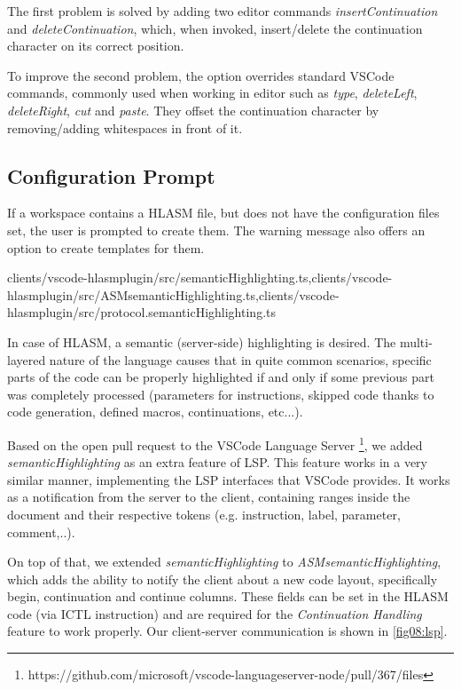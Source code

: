 The first problem is solved by adding two editor commands \emph{insertContinuation} and \emph{deleteContinuation}, which, when invoked, insert/delete the continuation character on its correct position.

To improve the second problem, the option overrides standard VSCode commands, commonly used when working in editor such as \emph{type}, \emph{deleteLeft}, \emph{deleteRight}, \emph{cut} and \emph{paste}. They offset the continuation character by removing/adding whitespaces in front of it.


\subsection{Configuration Prompt}

If a workspace contains a HLASM file, but does not have the configuration files set, the user is prompted to create them. The warning message also offers an option to create templates for them.

{clients/vscode-hlasmplugin/src/semanticHighlighting.ts,clients/vscode-hlasmplugin/src/ASMsemanticHighlighting.ts,clients/vscode-hlasmplugin/src/protocol.semanticHighlighting.ts}

In case of HLASM, a semantic (server-side) highlighting is desired. The multi-layered nature of the language causes that in quite common scenarios, specific parts of the code can be properly highlighted if and only if some previous part was completely processed (parameters for instructions, skipped code thanks to code generation, defined macros, continuations, etc...).

Based on the open pull request to the VSCode Language Server \footnote{https://github.com/microsoft/vscode-languageserver-node/pull/367/files}, we added \emph{semanticHighlighting} as an extra feature of LSP. This feature works in a very similar manner, implementing the LSP interfaces that VSCode provides. It works as a notification from the server to the client, containing ranges inside the document and their respective tokens (e.g. instruction, label, parameter, comment,..). 

On top of that, we extended \emph{semanticHighlighting} to \emph{ASMsemanticHighlighting}, which adds the ability to notify the client about a new code layout, specifically begin, continuation and continue columns. These fields can be set in the HLASM code (via ICTL instruction) and are required for the \emph{Continuation Handling} feature to work properly. Our client-server communication is shown in \cref{fig08:lsp}.


